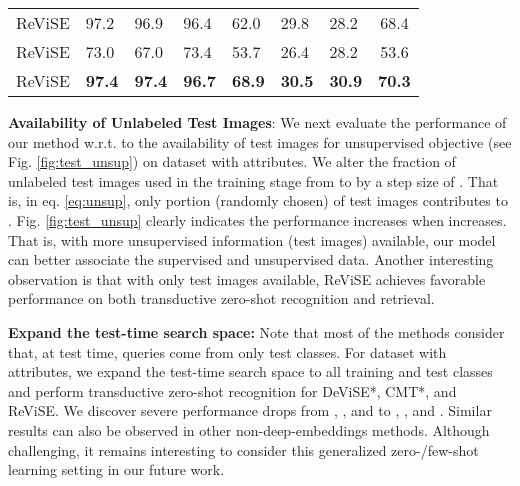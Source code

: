 {{\begin{table}[t!]
{\begin{tabular}{|c||lll||lll||c|}
ReViSE&              97.2            &               96.9          &          96.4                &    62.0           &       29.8            &        28.2       &        68.4          \\
ReViSE             &            73.0              &             67.0            &         73.4      &       53.7          &       26.4            &         28.2       &           53.6                \\
ReViSE                &          {\bf 97.4}                &          {\bf 97.4}               &         {\bf 96.7}            &      {\bf 68.9}           &       {\bf 30.5}      &        {\bf 30.9}          &          {\bf 70.3}           \\ \hline
\end{tabular}
}
\vspace{-4mm}
\label{tbl:zero_retr}
\end{table}

\vspace{0.1in}
\hspace{-5mm} {\bf Availability of Unlabeled Test Images}:
We next evaluate the performance of our method w.r.t. to the availability of test images for unsupervised objective (see Fig. \ref{fig:test_unsup}) on  dataset with  attributes. We alter the fraction  of unlabeled test images used in the training stage from  to  by a step size of . That is, in eq. \eqref{eq:unsup}, only  portion (randomly chosen) of test images contributes to . 
Fig. \ref{fig:test_unsup} clearly indicates the performance increases when  increases. That is, with more unsupervised information (test images) available, our model can better associate the supervised and unsupervised data.
Another interesting observation is that with only  test images available, ReViSE achieves favorable performance on both transductive zero-shot recognition and retrieval. 

\hspace{-5mm} {\bf Expand the test-time search space:} Note that most of the methods \cite{frome2013devise,socher2013zero,norouzi2013zero,zhang2015zero,akata2015evaluation,zhang2016zero1,xian2016latent,changpinyo2016synthesized,fu2015transductive} consider that, at test time, queries come from only test classes. For  dataset with  attributes, we expand the test-time search space to all training and test classes and perform transductive zero-shot recognition for DeViSE*, CMT*, and ReViSE. We discover severe performance drops from , , and  to , , and . Similar results can also be observed in other non-deep-embeddings methods. Although challenging, it remains interesting to consider this generalized zero-/few-shot learning setting in our future work.


}}
